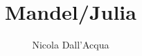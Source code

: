 %
%
%


\beamertemplatenavigationsymbolsempty
\title[Mandelbrot-Menge und Julia-Menge]{Mandel/Julia}
\author[N. Dall'Acqua]{Nicola Dall'Acqua}
\date[]{}

